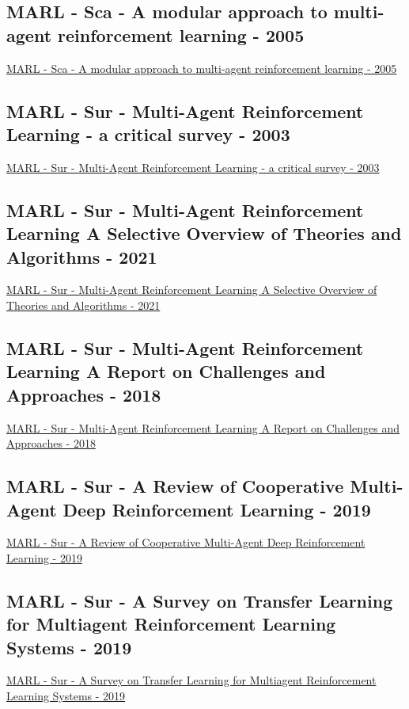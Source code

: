 \subsection{MARL - Sca - A modular approach to multi-agent reinforcement learning - 2005}
\href{https://link.springer.com/chapter/10.1007/3-540-62934-3_39}{MARL - Sca - A modular approach to multi-agent reinforcement learning - 2005}

\subsection{MARL - Sur - Multi-Agent Reinforcement Learning - a critical survey - 2003}
\href{http://ai.stanford.edu/people/shoham/www%20papers/MALearning_ACriticalSurvey_2003_0516.pdf}{MARL - Sur - Multi-Agent Reinforcement Learning - a critical survey - 2003}

\subsection{MARL - Sur - Multi-Agent Reinforcement Learning A Selective Overview of Theories and Algorithms - 2021}
\href{https://arxiv.org/abs/1911.10635}{MARL - Sur - Multi-Agent Reinforcement Learning A Selective Overview of Theories and Algorithms - 2021}

\subsection{MARL - Sur - Multi-Agent Reinforcement Learning A Report on Challenges and Approaches - 2018}
\href{https://arxiv.org/abs/1807.09427}{MARL - Sur - Multi-Agent Reinforcement Learning A Report on Challenges and Approaches - 2018}

\subsection{MARL - Sur - A Review of Cooperative Multi-Agent Deep Reinforcement Learning - 2019}
\href{https://arxiv.org/abs/1908.03963}{MARL - Sur - A Review of Cooperative Multi-Agent Deep Reinforcement Learning - 2019}

\subsection{MARL - Sur - A Survey on Transfer Learning for Multiagent Reinforcement Learning Systems  - 2019}
\href{https://www.jair.org/index.php/jair/article/view/11396}{MARL - Sur - A Survey on Transfer Learning for Multiagent Reinforcement Learning Systems  - 2019}

